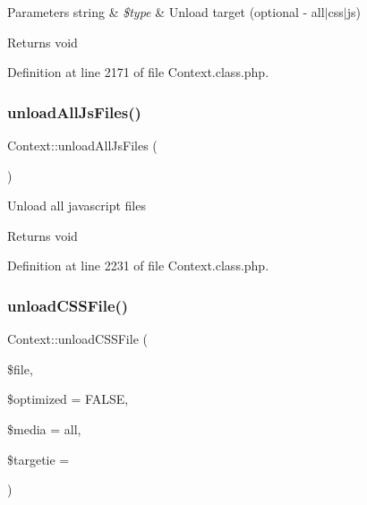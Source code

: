 \begin{DoxyParams}[1]{Parameters}
string & {\em \$type} & Unload target (optional -\/ all$\vert$css$\vert$js) \\
\hline
\end{DoxyParams}
\begin{DoxyReturn}{Returns}
void 
\end{DoxyReturn}


Definition at line 2171 of file Context.\+class.\+php.

\hypertarget{classContext_ac8ac4c21583b50815eb01d9cc4f6405f}{}\label{classContext_ac8ac4c21583b50815eb01d9cc4f6405f} 
\subsubsection{\texorpdfstring{unload\+All\+Js\+Files()}{unloadAllJsFiles()}}
{\footnotesize\ttfamily Context\+::unload\+All\+Js\+Files (\begin{DoxyParamCaption}{ }\end{DoxyParamCaption})}

Unload all javascript files

\begin{DoxyReturn}{Returns}
void 
\end{DoxyReturn}


Definition at line 2231 of file Context.\+class.\+php.

\hypertarget{classContext_a26b1057bf312eeda0fbfcb28256c406c}{}\label{classContext_a26b1057bf312eeda0fbfcb28256c406c} 
\subsubsection{\texorpdfstring{unload\+C\+S\+S\+File()}{unloadCSSFile()}}
{\footnotesize\ttfamily Context\+::unload\+C\+S\+S\+File (\begin{DoxyParamCaption}\item[{}]{\$file,  }\item[{}]{\$optimized = {\ttfamily FALSE},  }\item[{}]{\$media = {\ttfamily \textquotesingle{}all\textquotesingle{}},  }\item[{}]{\$targetie = {\ttfamily \textquotesingle{}\textquotesingle{}} }\end{DoxyParamCaption})}

